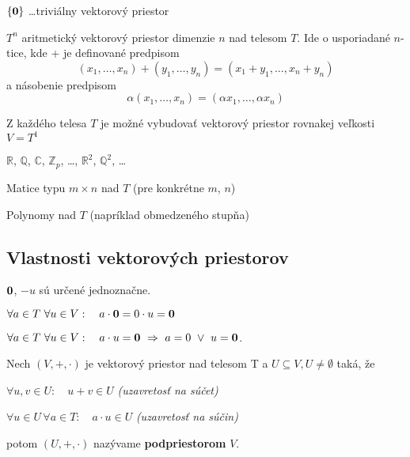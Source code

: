\pagebreak[2]
\begin{prikladySK}
\begin{pitemize}
\item $\{{\bf 0}\}$ \dots  triviálny vektorový priestor
\item $T^{n}$ aritmetický vektorový priestor dimenzie $n$ nad telesom $T$. Ide o usporiadané $n$-tice, kde + je definované predpisom
$$(x_{1}, \dots, x_{n}) + (y_{1}, \dots, y_{n}) = (x_{1} + y_{1}, \dots ,x_{n} + y_{n})$$
a násobenie predpisom
$$\alpha(x_1, \dots, x_n)=(\alpha x_1, \dots, \alpha x_n)$$
\item Z každého telesa $T$ je možné vybudovať vektorový priestor rovnakej veľkosti $V=T^{1}$
\item $\mathbb{R}$, $\mathbb{Q}$, $\mathbb{C}$, $\mathbb{Z}_{p}$, \dots, $\mathbb{R}^{2}$, $\mathbb{Q}^{2}$, \dots 
\item Matice typu $m \times n$ nad $T$ (pre konkrétne $m$, $n$)
\item Polynomy nad $T$ (napríklad obmedzeného stupňa)
\end{pitemize}
\end{prikladySK}

\subsection{Vlastnosti vektorových priestorov}

\begin{pozorovanie}
\begin{penumerate}
\item ${\bf 0}$, $-u$ sú určené jednoznačne.
\item $\forall a \in T \ \forall u \in V: \quad a \cdot {\bf 0} = 0 \cdot u = {\bf 0}$
\item $\forall a \in T \ \forall u \in V: \quad a \cdot u = {\bf 0} \ \Rightarrow\ a = 0 \ \lor\ u = {\bf 0}$.
\end{penumerate}
\end{pozorovanie}

\begin{definicia}
Nech $(V,+, \cdot )$ je vektorový priestor nad telesom T a $U \subseteq V, U \not= \emptyset$ taká, že
\begin{pitemize}
\item $\forall u,v \in U: \quad u+v \in U$ \hfill\textit{(uzavretosť na súčet)}
\item $\forall u \in U \, \forall a \in T: \quad a \cdot u \in U$ \hfill\textit{(uzavretosť na súčin)}
\end{pitemize}
potom $(U,+, \cdot )$ nazývame \textbf{podpriestorom} $V$.
\end{definicia}

